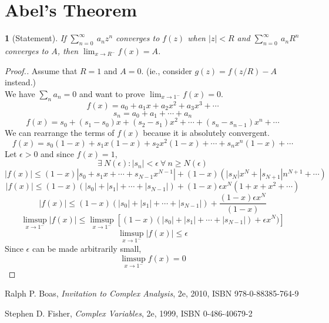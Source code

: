 \documentclass[12pt]{article}
\theoremstyle{named}
\newtheorem*{theorem}{}
\begin{document}
\section{Abel's Theorem}
\begin{theorem}[Statement]
	If $\sum_{n=0}^{\infty} ~a_{n}z^{n}$ converges to $f(z)$ when $|z| < R$ and $\sum_{n=0}^{\infty} ~a_{n}R^{n}$
	converges to $A$, then $\lim_{x \to R^{-}} f(x) = A$.
\end{theorem}
\begin{proof}[Proof.]
Assume that $R = 1$ and $A = 0$. (ie., consider $g(z) = f(z/R) - A$ instead.)
\\ We have $\sum_n a_n = 0$ and want to prove $\lim_{x \to 1^-} f(x) = 0$.
$$ f(x) = a_0 + a_1 x + a_2 x^2 + a_3 x^3 + \cdots $$
$$ s_n = a_0 + a_1 + \cdots + a_n $$
$$ f(x) = s_0 + (s_1 - s_0)x + (s_2 - s_1)x^2 + \cdots + (s_n - s_{n-1})x^n + \cdots $$
We can rearrange the terms of $f(x)$ because it is absolutely convergent.
$$ f(x) = s_0(1-x) + s_1 x(1-x) + s_2 x^2 (1-x) + \cdots + s_n x^n (1-x) + \cdots $$
Let $\epsilon > 0$ and since $f(x) = 1$,
$$ \exists~ N(\epsilon): |s_n| < \epsilon ~\forall~ n \geq N(\epsilon) $$
$$ |f(x)| \leq (1-x)\left|s_0 + s_1x + \cdots + s_{N-1} x^{N-1}\right| + (1-x)(|s_N| x^N + |s_{N+1}|n^{N+1} + \cdots) $$
$$ |f(x)| \leq (1-x)(|s_0| + |s_1| + \cdots + |s_{N-1}|) + (1-x) \epsilon x^N (1 + x + x^2 + \cdots ) $$
$$ |f(x)| \leq (1-x)(|s_0| + |s_1| + \cdots + |s_{N-1}|) + \frac{(1-x) \epsilon x^N}{(1-x)} $$
$$ \limsup\limits_{x\to1^-} |f(x)| \leq \limsup\limits_{x\to1^-} \left[ (1-x)(|s_0| + |s_1| + \cdots + |s_{N-1}|) + \epsilon x^N) \right] $$
$$ \limsup\limits_{x\to1^-} |f(x)| \leq \epsilon $$
Since $\epsilon$ can be made arbitrarily small,
$$ \limsup\limits_{x\to1^-} f(x) = 0 $$
\end{proof}

%

\begin{thebibliography}{44}
Ralph P. Boas, \emph{Invitation to Complex Analysis}, 2e, 2010, ISBN 978-0-88385-764-9

Stephen D. Fisher, \emph{Complex Variables}, 2e, 1999, ISBN 0-486-40679-2
\end{thebibliography}
\end{document}
